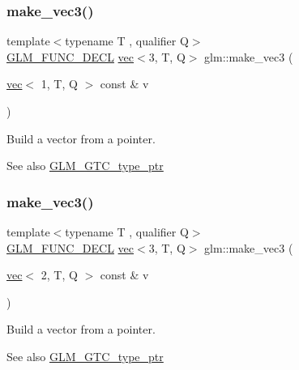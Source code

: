 \subsubsection{\texorpdfstring{make\+\_\+vec3()}{make\_vec3()}\hspace{0.1cm}{\footnotesize\ttfamily [1/5]}}
{\footnotesize\ttfamily template$<$typename T , qualifier Q$>$ \\
\mbox{\hyperlink{setup_8hpp_ab2d052de21a70539923e9bcbf6e83a51}{G\+L\+M\+\_\+\+F\+U\+N\+C\+\_\+\+D\+E\+CL}} \mbox{\hyperlink{structglm_1_1vec}{vec}}$<$3, T, Q$>$ glm\+::make\+\_\+vec3 (\begin{DoxyParamCaption}\item[{\mbox{\hyperlink{structglm_1_1vec}{vec}}$<$ 1, T, Q $>$ const \&}]{v }\end{DoxyParamCaption})\hspace{0.3cm}{\ttfamily [inline]}}

Build a vector from a pointer. \begin{DoxySeeAlso}{See also}
\mbox{\hyperlink{group__gtc__type__ptr}{G\+L\+M\+\_\+\+G\+T\+C\+\_\+type\+\_\+ptr}} 
\end{DoxySeeAlso}
\mbox{\label{group__gtc__type__ptr_ga482b60a842a5b154d3eed392417a9511}} 
\subsubsection{\texorpdfstring{make\+\_\+vec3()}{make\_vec3()}\hspace{0.1cm}{\footnotesize\ttfamily [2/5]}}
{\footnotesize\ttfamily template$<$typename T , qualifier Q$>$ \\
\mbox{\hyperlink{setup_8hpp_ab2d052de21a70539923e9bcbf6e83a51}{G\+L\+M\+\_\+\+F\+U\+N\+C\+\_\+\+D\+E\+CL}} \mbox{\hyperlink{structglm_1_1vec}{vec}}$<$3, T, Q$>$ glm\+::make\+\_\+vec3 (\begin{DoxyParamCaption}\item[{\mbox{\hyperlink{structglm_1_1vec}{vec}}$<$ 2, T, Q $>$ const \&}]{v }\end{DoxyParamCaption})\hspace{0.3cm}{\ttfamily [inline]}}

Build a vector from a pointer. \begin{DoxySeeAlso}{See also}
\mbox{\hyperlink{group__gtc__type__ptr}{G\+L\+M\+\_\+\+G\+T\+C\+\_\+type\+\_\+ptr}} 
\end{DoxySeeAlso}
\mbox{\label{group__gtc__type__ptr_gacd57046034df557b8b1c457f58613623}} 
